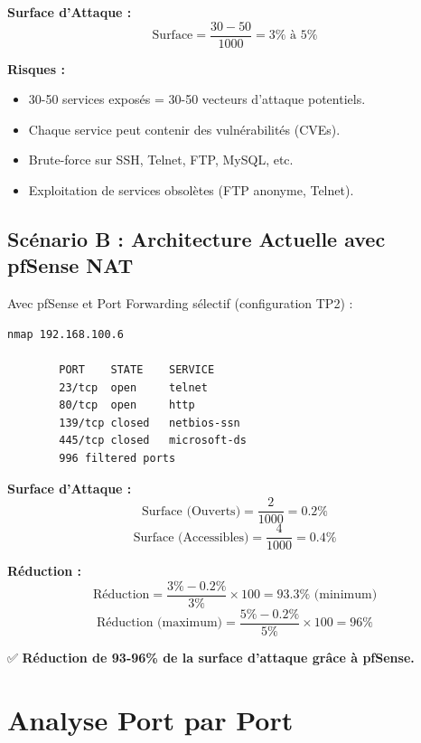 \documentclass[12pt,a4paper,openany]{report}
\begin{document}
	\textbf{Surface d'Attaque :}
	\[
	\text{Surface} = \frac{30-50}{1000} = 3\% \text{ à } 5\%
	\]
	
	\textbf{Risques :}
	\begin{itemize}
		\item 30-50 services exposés = 30-50 vecteurs d'attaque potentiels.
		\item Chaque service peut contenir des vulnérabilités (CVEs).
		\item Brute-force sur SSH, Telnet, FTP, MySQL, etc.
		\item Exploitation de services obsolètes (FTP anonyme, Telnet).
	\end{itemize}
	
	\subsection{Scénario B : Architecture Actuelle avec pfSense NAT}
	Avec pfSense et Port Forwarding sélectif (configuration TP2) :
	
	\begin{lstlisting}[caption=Scan Nmap réel avec pfSense]
		nmap 192.168.100.6
		
		PORT    STATE    SERVICE
		23/tcp  open     telnet
		80/tcp  open     http
		139/tcp closed   netbios-ssn
		445/tcp closed   microsoft-ds
		996 filtered ports
	\end{lstlisting}
	
	\textbf{Surface d'Attaque :}
	\[
	\text{Surface (Ouverts)} = \frac{2}{1000} = 0.2\%
	\]
	\[
	\text{Surface (Accessibles)} = \frac{4}{1000} = 0.4\%
	\]
	
	\textbf{Réduction :}
	\[
	\text{Réduction} = \frac{3\% - 0.2\%}{3\%} \times 100 = 93.3\% \text{ (minimum)}
	\]
	\[
	\text{Réduction (maximum)} = \frac{5\% - 0.2\%}{5\%} \times 100 = 96\%
	\]
	
	✅ \textbf{Réduction de 93-96\% de la surface d'attaque grâce à pfSense.}
	
	\section{Analyse Port par Port}
	
\end{document}
